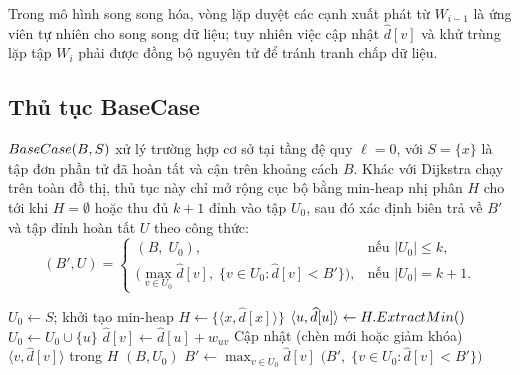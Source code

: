 Trong mô hình song song hóa, vòng lặp duyệt các cạnh xuất phát từ $W_{i-1}$ là ứng viên tự nhiên cho song song dữ liệu; tuy nhiên việc cập nhật $\widehat{d}[v]$ và khử trùng lặp tập $W_i$ phải được đồng bộ nguyên tử để tránh tranh chấp dữ liệu.

\subsection{Thủ tục BaseCase}

$\textsc{BaseCase}(B, S)$ xử lý trường hợp cơ sở tại tầng đệ quy $\ell = 0$, với $S = \{x\}$ là tập đơn phần tử đã hoàn tất và cận trên khoảng cách $B$. Khác với Dijkstra chạy trên toàn đồ thị, thủ tục này chỉ mở rộng cục bộ bằng min-heap nhị phân $H$ cho tới khi $H = \emptyset$ hoặc thu đủ $k + 1$ đỉnh vào tập $U_0$, sau đó xác định biên trả về $B'$ và tập đỉnh hoàn tất $U$ theo công thức:
\begin{equation}
    (B', U) =
    \begin{cases}
        (B,\; U_0), & \text{nếu } |U_0| \le k, \\[4pt]
        \bigl(\max_{v \in U_0}\widehat{d}[v],\; \{v \in U_0 : \widehat{d}[v] < B'\}\bigr), & \text{nếu } |U_0| = k + 1.
    \end{cases}
    \label{eq:basecase-return}
\end{equation}

\begin{algorithm}[htbp]
\caption{Thủ tục cơ sở $\textsc{BaseCase}(B, S)$}
\label{alg:basecase}
\begin{algorithmic}[1]
 
    \State $U_0 \leftarrow S$; \; khởi tạo min-heap $H \leftarrow \{\langle x, \widehat{d}[x] \rangle\}$
        \State $\langle u, \widehat{d}[u] \rangle \leftarrow H.\textsc{ExtractMin}()$
        \State $U_0 \leftarrow U_0 \cup \{u\}$
                \State $\widehat{d}[v] \leftarrow \widehat{d}[u] + w_{uv}$
                \State Cập nhật (chèn mới hoặc giảm khóa) $\langle v, \widehat{d}[v] \rangle$ trong $H$
            \EndIf
        \EndFor
    \EndWhile
        \Return $(B, U_0)$
    \Else
        \State $B' \leftarrow \max_{v \in U_0} \widehat{d}[v]$
        \State \Return $\bigl(B',\; \{v \in U_0 : \widehat{d}[v] < B'\}\bigr)$
    \EndIf
\EndFunction
\end{algorithmic}
\end{algorithm}

